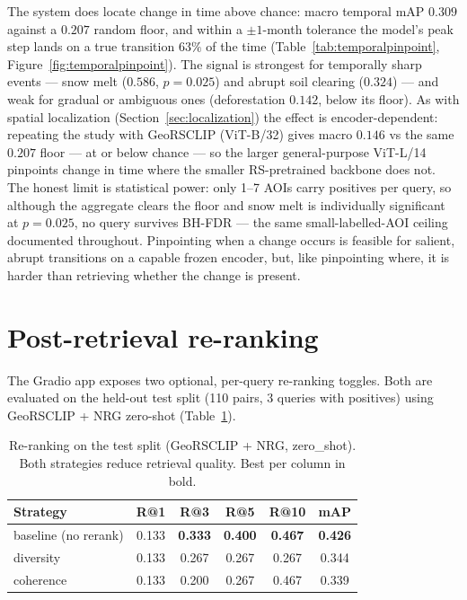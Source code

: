 \documentclass{article}
\begin{document}
\begin{appendices}
The system does locate change in time above chance: macro temporal mAP $0.309$
against a $0.207$ random floor, and within a $\pm1$-month tolerance the model's peak
step lands on a true transition $63\%$ of the time
(Table~\ref{tab:temporalpinpoint}, Figure~\ref{fig:temporalpinpoint}). The signal
is strongest for temporally sharp events --- snow melt ($0.586$, $p=0.025$) and
abrupt soil clearing ($0.324$) --- and weak for gradual or ambiguous ones
(deforestation $0.142$, below its floor). As with spatial localization
(Section~\ref{sec:localization}) the effect is encoder-dependent: repeating the
study with GeoRSCLIP (ViT-B/32) gives macro $0.146$ vs the same $0.207$ floor --- at
or below chance --- so the larger general-purpose ViT-L/14 pinpoints change in time
where the smaller RS-pretrained backbone does not. The honest limit is statistical
power: only 1--7 AOIs carry positives per query, so although the aggregate clears
the floor and snow melt is individually significant at $p=0.025$, no query survives
BH-FDR --- the same small-labelled-AOI ceiling documented throughout. Pinpointing
when a change occurs is feasible for salient, abrupt transitions on a capable frozen
encoder, but, like pinpointing where, it is harder than retrieving whether the
change is present.

\clearpage
\section{Post-retrieval re-ranking}
\label{sec:rerank}

The Gradio app exposes two optional, per-query re-ranking toggles. Both are
evaluated on the held-out test split (110 pairs, 3 queries with positives) using
GeoRSCLIP + NRG zero-shot (Table~\ref{tab:rerank}).

\begin{table}[H]
    \centering
    \caption{Re-ranking on the test split (GeoRSCLIP + NRG, zero\_shot). Both
    strategies reduce retrieval quality. Best per column in bold.}
    \label{tab:rerank}
    \begin{tabular}{lccccc}
        \toprule
        \textbf{Strategy} & \textbf{R@1} & \textbf{R@3} & \textbf{R@5} & \textbf{R@10} & \textbf{mAP} \\
        \midrule
        baseline (no rerank) & 0.133 & \textbf{0.333} & \textbf{0.400} & \textbf{0.467} & \textbf{0.426} \\
        diversity            & 0.133 & 0.267 & 0.267 & 0.267 & 0.344 \\
        coherence            & 0.133 & 0.200 & 0.267 & 0.467 & 0.339 \\
        \bottomrule
    \end{tabular}
\end{table}


\end{appendices}
\end{document}
